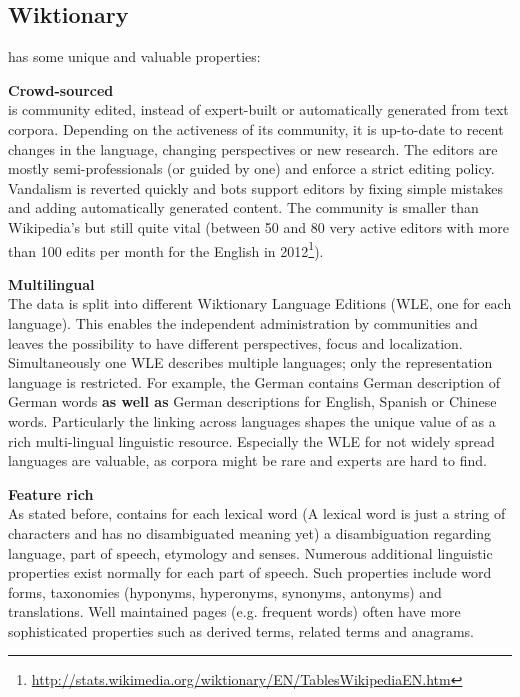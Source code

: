 \subsection{Wiktionary}\label{sec:wiktionary}
\wik has some unique and valuable properties:
\begin{compactitem}
  \item \textbf{Crowd-sourced} \\
    \wik is community edited, instead of expert-built or automatically generated from text corpora. 
    Depending on the activeness of its community, it is up-to-date to recent changes in the language, changing perspectives or new research. 
    The editors are mostly semi-professionals (or guided by one) and enforce a strict editing policy. 
    Vandalism is reverted quickly and bots support editors by fixing simple mistakes and adding automatically generated content. 
    The community is smaller than Wikipedia's but still quite vital (between 50 and 80 very active editors with more than 100 edits per month for the English \wik in 2012\footnote{\url{http://stats.wikimedia.org/wiktionary/EN/TablesWikipediaEN.htm}}). 
   \item \textbf{Multilingual}\\
    The data is split into different Wiktionary Language Editions (WLE, one for each language). 
    This enables the independent administration by communities and leaves the possibility to have different perspectives, focus and localization.
    Simultaneously one WLE describes multiple languages; only the representation language is restricted. 
    For example, the German \wik contains German description of German words \textbf{as well as} German descriptions for English, Spanish or Chinese words. 
    Particularly the linking across languages shapes the unique value of \wik as a rich multi-lingual linguistic resource. 
    Especially the WLE for not widely spread languages are valuable, as corpora might be rare and experts are hard to find.
  \item \textbf{Feature rich}\\
    As stated before, \wik contains for each lexical word (A lexical word is just a string of characters and has no disambiguated meaning yet) a disambiguation regarding language, part of speech, etymology and senses. 
    Numerous additional linguistic properties exist normally for each part of speech. 
    Such properties include word forms, taxonomies (hyponyms, hyperonyms, synonyms, antonyms) and translations.
    Well maintained pages (e.g. frequent words) often have more sophisticated properties such as derived terms, related terms and anagrams.

\end{compactitem}
